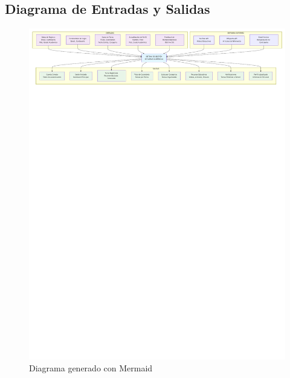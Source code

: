 \documentclass{pretexto/report}
\begin{document}
\subsection{Diagrama de Entradas y Salidas}
\begin{figure}[H]
    \centering
    \includegraphics[width=\linewidth]{pdfs/e_s.pdf}
    \caption{Diagrama generado con Mermaid}
\end{figure}
\end{document}
